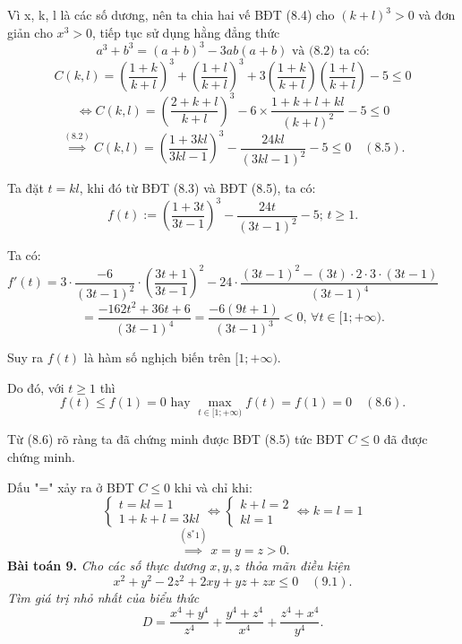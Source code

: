\documentclass[12pt]{report}
\begin{document}
\noindent Vì x, k, l là các số dương, nên ta chia hai vế BĐT (8.4) cho $(k + l)^3 > 0$ và đơn giản cho $x^3 > 0$, tiếp tục sử dụng hằng đẳng thức
\[
a^3 + b^3 = (a + b)^3 - 3ab(a + b) \text{ và (8.2) ta có:}
\]
\[
C(k, l) = \left(\dfrac{1 + k}{k + l}\right)^3 + \left(\dfrac{1 + l}{k + l}\right)^3 + 3\left(\dfrac{1 + k}{k + l}\right)\left(\dfrac{1 + l}{k + l}\right) - 5 \leq 0
\]
\[
\Leftrightarrow C(k, l) = \left(\dfrac{2 + k + l}{k + l}\right)^3 - 6 \times \dfrac{1 + k + l + kl}{(k + l)^2} - 5 \leq 0
\]
\[
\overset{(8.2)}{\implies} C(k, l) = \left(\dfrac{1 + 3kl}{3kl - 1}\right)^3 - \dfrac{24kl}{(3kl - 1)^2} - 5 \leq 0 \quad (8.5).
\]

\noindent Ta đặt $t = kl$, khi đó từ BĐT (8.3) và BĐT (8.5), ta có:
\[
f(t) := \left(\dfrac{1 + 3t}{3t - 1}\right)^3 - \dfrac{24t}{(3t - 1)^2} - 5; \, t \geq 1.
\]

\noindent Ta có: $f'(t) = 3 \cdot \dfrac{-6}{(3t - 1)^2} \cdot \left(\dfrac{3t + 1}{3t - 1}\right)^2 - 24 \cdot \dfrac{(3t - 1)^2 - (3t) \cdot 2 \cdot 3 \cdot (3t - 1)}{(3t - 1)^4}$
\[
= \dfrac{-162t^2 + 36t + 6}{(3t - 1)^4} = \dfrac{-6(9t + 1)}{(3t - 1)^3} < 0, \, \forall t \in [1; +\infty).
\]

\noindent Suy ra $f(t)$ là hàm số nghịch biến trên $[1; +\infty)$.

\noindent Do đó, với $t \geq 1$ thì
\[
f(t) \leq f(1) = 0 \text{ hay } \max_{t \in [1; +\infty)} f(t) = f(1) = 0 \quad (8.6).
\]

\noindent Từ (8.6) rõ ràng ta đã chứng minh được BĐT (8.5) tức BĐT $C \leq 0$ đã được chứng minh.

\noindent Dấu "=" xảy ra ở BĐT $C \leq 0$ khi và chỉ khi:
\[
\begin{cases} t = kl = 1 \\ 1 + k + l = 3kl \end{cases} \Leftrightarrow \begin{cases} k + l = 2 \\ kl = 1 \end{cases} \Leftrightarrow k = l = 1
\]
\[
\overset{(8^*1)}{\implies} x = y = z > 0.
\]
\vspace{0.4cm}
\noindent \textbf{Bài toán 9.} \textit{Cho các số thực dương $x, y, z$ thỏa mãn điều kiện}
\[
x^2 + y^2 - 2z^2 + 2xy + yz + zx \leq 0 \quad (9.1).
\]
\noindent \textit{Tìm giá trị nhỏ nhất của biểu thức}
\[
D = \dfrac{x^4 + y^4}{z^4} + \dfrac{y^4 + z^4}{x^4} + \dfrac{z^4 + x^4}{y^4}.
\]
\end{document}

